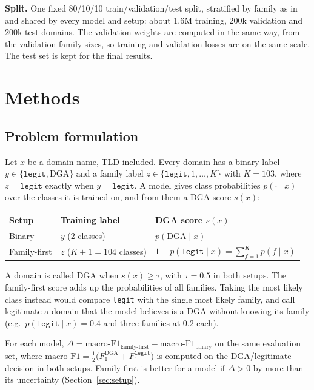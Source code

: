 \documentclass[11pt]{article}
\begin{document}
\textbf{Split.} One fixed 80/10/10 train/validation/test split, stratified by
family as in~\cite{shahzad2021dga} and shared by every model and setup: about
1.6M training, 200k validation and 200k test domains. The validation weights are
computed in the same way, from the validation family sizes, so training and
validation losses are on the same scale. The test set is kept for the final
results.

\section{Methods}\label{sec:methods}

\subsection{Problem formulation}\label{sec:formulation}
Let $x$ be a domain name, TLD included. Every domain has a binary label
$y \in \{\texttt{legit}, \text{DGA}\}$ and a family label
$z \in \{\texttt{legit}, 1, \dots, K\}$ with $K = 103$, where $z = \texttt{legit}$
exactly when $y = \texttt{legit}$. A model gives class probabilities
$p(\cdot \mid x)$ over the classes it is trained on, and from them a DGA score
$s(x)$:

\begin{center}
\small
\begin{tabular}{@{}lll@{}}
\toprule
Setup & Training label & DGA score $s(x)$ \\
\midrule
Binary & $y$ (2 classes) & $p(\text{DGA} \mid x)$ \\
Family-first & $z$ ($K + 1 = 104$ classes) & $1 - p(\texttt{legit} \mid x) = \sum_{f=1}^{K} p(f \mid x)$ \\
\bottomrule
\end{tabular}
\end{center}

A domain is called DGA when $s(x) \ge \tau$, with $\tau = 0.5$ in both setups.
The family-first score adds up the probabilities of all families. Taking the most
likely class instead would compare \texttt{legit} with the single most likely
family, and call legitimate a domain that the model believes is a DGA without
knowing its family (e.g.\ $p(\texttt{legit} \mid x) = 0.4$ and three families at
0.2 each).

For each model,
$\Delta = \text{macro-F1}_{\text{family-first}} - \text{macro-F1}_{\text{binary}}$
on the same evaluation set, where
$\text{macro-F1} = \tfrac{1}{2}\big(F_1^{\text{DGA}} + F_1^{\texttt{legit}}\big)$ is
computed on the DGA/legitimate decision in both setups. Family-first is better for
a model if $\Delta > 0$ by more than its uncertainty (Section~\ref{sec:setup}).
\end{document}
